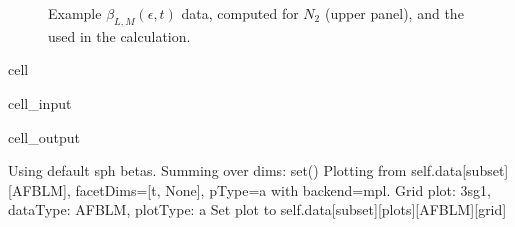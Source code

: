 \documentclass[letterpaper,table,10pt,english]{jupyterBook}
\begin{document}
\begin{figure}[htbp]
\centering
\capstart

\noindent{}
\caption{Example \(\beta_{L,M}(\epsilon,t)\) data, computed for \(N_2\) (upper panel), and the {\hyperref[\detokenize{backmatter/glossary:term-ADMs}]{}} used in the calculation.}\label{\detokenize{part1/theory_observables_intro_100723:fig-n2blmtdemo}}\end{figure}

\begin{sphinxuseclass}{cell}\begin{sphinxVerbatimInput}

\begin{sphinxuseclass}{cell_input}
\begin{sphinxVerbatim}[commandchars=\\\{\}]
    
     
                  
               
\end{sphinxVerbatim}

\end{sphinxuseclass}\end{sphinxVerbatimInput}
\begin{sphinxVerbatimOutput}

\begin{sphinxuseclass}{cell_output}
\begin{sphinxVerbatim}[commandchars=\\\{\}]
Using default sph betas.
Summing over dims: set()
Plotting from self.data[subset][AFBLM], facetDims=[\PYGZsq{}t\PYGZsq{}, None], pType=a with backend=mpl.
Grid plot: 3sg\PYGZhy{}1, dataType: AFBLM, plotType: a
Set plot to self.data[\PYGZsq{}subset\PYGZsq{}][\PYGZsq{}plots\PYGZsq{}][\PYGZsq{}AFBLM\PYGZsq{}][\PYGZsq{}grid\PYGZsq{}]
\end{sphinxVerbatim}


\end{sphinxuseclass}
\end{sphinxVerbatimOutput}
\end{sphinxuseclass}
\end{document}
